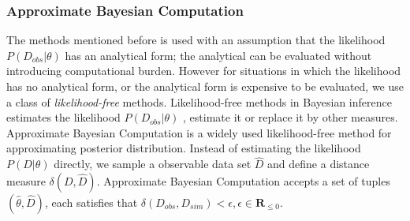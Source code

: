 \subsubsection{Approximate Bayesian Computation}
The methods mentioned before is used with an assumption that the likelihood $P(D_{obs}|\theta)$ has
an analytical form; the analytical can be evaluated without introducing computational burden.
However for situations in which the likelihood has no analytical form, or the analytical form is
expensive to be evaluated, we use a class of \textit{likelihood-free} methods. Likelihood-free
methods in Bayesian inference estimates the likelihood $P(D_{obs}|\theta)$ ,
estimate it or replace it by other measures. Approximate Bayesian Computation is a widely used
likelihood-free method for approximating posterior distribution. Instead of estimating the
likelihood $P(D|\theta)$ directly, we sample a observable data set $\hat{D}$ and define a distance
measure $\delta(D, \hat{D})$. Approximate Bayesian Computation accepts a set of tuples
$(\hat{\theta}, \hat{D})$, each satisfies that $\delta(D_{obs},D_{sim}) < \epsilon,
      \epsilon\in\mathbf{R}_{\leq 0}$.
